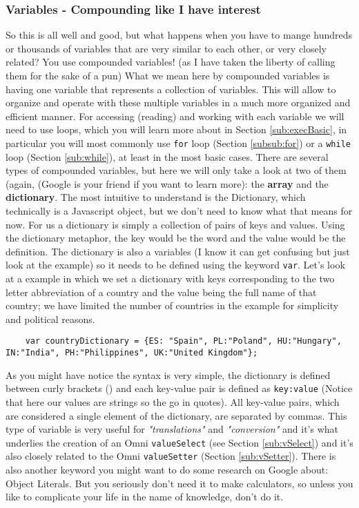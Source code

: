\subsubsection{Variables - Compounding like I have interest} 
\label{subsub:array}
So this is all well and good, but what happens when you have to mange hundreds or thousands of variables that are very similar to each other, or very closely related?  You use compounded variables! (as I have taken the liberty of calling them for the sake of a pun)
What we mean here by compounded variables is having one variable that represents a collection of variables. This will allow to organize and operate with these multiple variables in a much more organized and efficient manner. For accessing (reading) and working with each variable we will need to use loops, which you will learn more about in Section \ref{sub:execBasic}, in particular you will most commonly use \texttt{for} loop (Section \ref{subsub:for}) or a \texttt{while} loop (Section \ref{sub:while}), at least in the most basic cases. 
There are several types of compounded variables, but here we will only take a look at two of them (again, (Google is your friend if you want to learn more): the \textbf{array} and the \textbf{dictionary}.
The most intuitive to understand is the Dictionary, which technically is a Javascript object, but we don't need to know what that means for now. For us a dictionary is simply a collection of pairs of keys and values. Using the dictionary metaphor, the key would be the word and the value would be the definition. The dictionary is also a variables (I know it can get confusing but just look at the example) so it needs to be defined using the keyword \texttt{var}.
Let's look at a example in which we set a dictionary with keys corresponding to the two letter abbreviation of a country and the value being the full name of that country; we have limited the number of countries in the example for simplicity and political reasons.

\begin{lstlisting}
    var countryDictionary = {ES: "Spain", PL:"Poland", HU:"Hungary", IN:"India", PH:"Philippines", UK:"United Kingdom"}; 
\end{lstlisting}
As you might have notice the syntax is very simple, the dictionary is defined between curly brackets ({}) and each key-value pair is defined as \texttt{key:value} (Notice that here our values are strings so the go in quotes). All key-value pairs, which are considered a single element of the dictionary, are separated by commas. 
This type of variable is very useful for \textit{"translations"} and \textit{"conversion"} and it's what underlies the creation of an Omni \texttt{valueSelect} (see Section \ref{sub:vSelect}) and it's also closely related to the Omni \texttt{valueSetter} (Section \ref{sub:vSetter}). There is also another keyword you might want to do some research on Google about: Object Literals. But you seriously don't need it to make calculators, so unless you like to complicate your life in the name of knowledge, don't do it.

